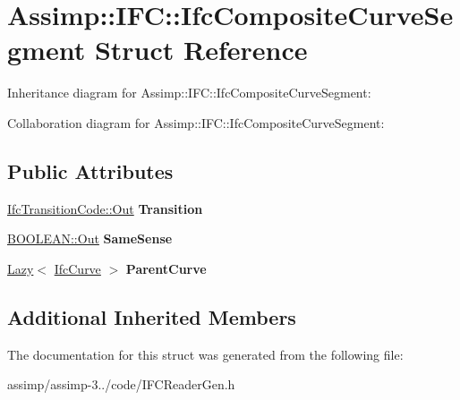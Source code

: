 \hypertarget{struct_assimp_1_1_i_f_c_1_1_ifc_composite_curve_segment}{\section{Assimp\+:\+:I\+F\+C\+:\+:Ifc\+Composite\+Curve\+Segment Struct Reference}
\label{struct_assimp_1_1_i_f_c_1_1_ifc_composite_curve_segment}
}


Inheritance diagram for Assimp\+:\+:I\+F\+C\+:\+:Ifc\+Composite\+Curve\+Segment\+:


Collaboration diagram for Assimp\+:\+:I\+F\+C\+:\+:Ifc\+Composite\+Curve\+Segment\+:
\subsection*{Public Attributes}
\begin{DoxyCompactItemize}
\item 
\hypertarget{struct_assimp_1_1_i_f_c_1_1_ifc_composite_curve_segment_abbc99ce740fa4eef1948d528c7bf73b9}{\hyperlink{classboost_1_1shared__ptr}{Ifc\+Transition\+Code\+::\+Out} {\bfseries Transition}}\label{struct_assimp_1_1_i_f_c_1_1_ifc_composite_curve_segment_abbc99ce740fa4eef1948d528c7bf73b9}

\item 
\hypertarget{struct_assimp_1_1_i_f_c_1_1_ifc_composite_curve_segment_a1b663959add7eaa0948dad3d75f89c5e}{\hyperlink{classboost_1_1shared__ptr}{B\+O\+O\+L\+E\+A\+N\+::\+Out} {\bfseries Same\+Sense}}\label{struct_assimp_1_1_i_f_c_1_1_ifc_composite_curve_segment_a1b663959add7eaa0948dad3d75f89c5e}

\item 
\hypertarget{struct_assimp_1_1_i_f_c_1_1_ifc_composite_curve_segment_a77c2fd9b57fd384eca4baf06dc7c6ade}{\hyperlink{struct_assimp_1_1_s_t_e_p_1_1_lazy}{Lazy}$<$ \hyperlink{struct_assimp_1_1_i_f_c_1_1_ifc_curve}{Ifc\+Curve} $>$ {\bfseries Parent\+Curve}}\label{struct_assimp_1_1_i_f_c_1_1_ifc_composite_curve_segment_a77c2fd9b57fd384eca4baf06dc7c6ade}

\end{DoxyCompactItemize}
\subsection*{Additional Inherited Members}


The documentation for this struct was generated from the following file\+:\begin{DoxyCompactItemize}
\item 
assimp/assimp-\/3../code/I\+F\+C\+Reader\+Gen.\+h\end{DoxyCompactItemize}
